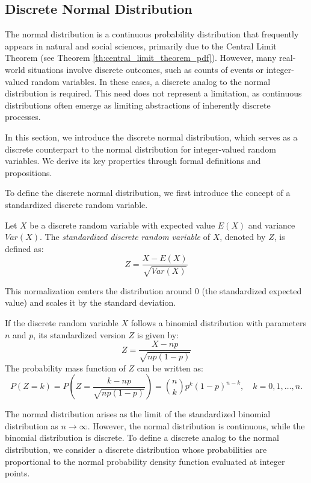 %
%

\subsection{Discrete Normal Distribution}

The normal distribution is a continuous probability distribution that frequently appears in natural and social sciences, primarily due to the Central Limit Theorem (see Theorem \ref{th:central_limit_theorem_pdf}). However, many real-world situations involve discrete outcomes, such as counts of events or integer-valued random variables. In these cases, a discrete analog to the normal distribution is required. This need does not represent a limitation, as continuous distributions often emerge as limiting abstractions of inherently discrete processes.

In this section, we introduce the discrete normal distribution, which serves as a discrete counterpart to the normal distribution for integer-valued random variables. We derive its key properties through formal definitions and propositions.

To define the discrete normal distribution, we first introduce the concept of a standardized discrete random variable.

\begin{definition}
Let $X$ be a discrete random variable with expected value $E(X)$ and variance $Var(X)$. The \emph{standardized discrete random variable} of $X$, denoted by $Z$, is defined as:
\[
Z = \frac{X - E(X)}{\sqrt{Var(X)}}
\]
\end{definition}

This normalization centers the distribution around 0 (the standardized expected value) and scales it by the standard deviation. 

\begin{example}
If the discrete random variable $X$ follows a binomial distribution with parameters $n$ and $p$, its standardized version $Z$ is given by:
\[
Z = \frac{X - np}{\sqrt{np(1-p)}}
\]
The probability mass function of $Z$ can be written as:
\[
P\left(Z = k\right) = P\left( Z = \frac{k - np}{\sqrt{np(1-p)}} \right) = \binom{n}{k} p^k (1-p)^{n-k}, \quad k = 0, 1, \dots, n.
\]
\end{example}

The normal distribution arises as the limit of the standardized binomial distribution as \( n \to \infty \). However, the normal distribution is continuous, while the binomial distribution is discrete. To define a discrete analog to the normal distribution, we consider a discrete distribution whose probabilities are proportional to the normal probability density function evaluated at integer points.

